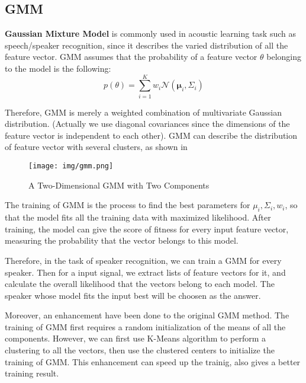 
\subsection{GMM}
\textbf{Gaussian Mixture Model} is commonly used in acoustic learning task such as speech/speaker recognition,
since it describes the varied distribution of all the feature vector.
GMM assumes that the probability of a feature vector $ \theta$ belonging to the model is the following:
    \[ p(\theta) = \sum_{i=1}^{K}{w_i \mathcal{N}(\mathbf{\mu}_i, \Sigma_i)}\]

  Therefore, GMM is merely a weighted combination of multivariate Gaussian distribution.
  (Actually we use diagonal covariances since the dimensions of the feature vector is independent to each other).
  GMM can describe the distribution of feature vector with several clusters, as shown in 
\begin{figure}[H]
  \centering
  \texttt{[image: img/gmm.png]}
  \caption{A Two-Dimensional GMM with Two Components\label{fig:gmm-fig}}
\end{figure}

The training of GMM is the process to find the best parameters for $ \mu_i, \Sigma_i, w_i$,
so that the model fits all the training data with maximized likelihood.
After training, the model can give the score of fitness for every input feature vector,
measuring the probability that the vector belongs to this model.

Therefore, in the task of speaker recognition, we can train a GMM for every speaker.
Then for a input signal, we extract lists of feature vectors for it, and calculate the
overall likelihood that the vectors belong to each model.
The speaker whose model fits the input best will be choosen as the answer.

Moreover, an enhancement have been done to the original GMM method.
The training of GMM first requires a random initialization of the means of
all the components. However, we can first use K-Means algorithm\cite{kmeans} to perform a clustering
to all the vectors, then use the clustered centers to initialize the training of GMM.
This enhancement can speed up the trainig, also gives a better training result.



